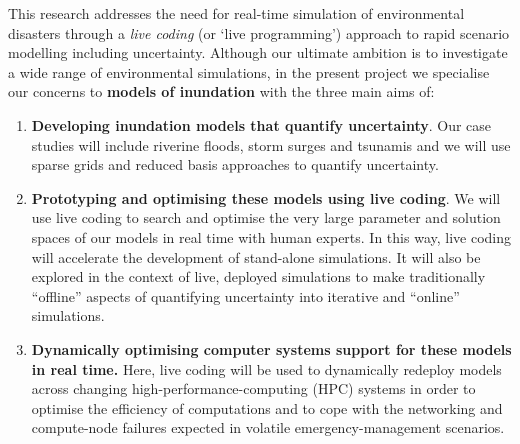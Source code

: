 This research addresses the need for real-time simulation of
environmental disasters through a {\em live coding} (or ‘live programming’)
approach to {rapid scenario modelling including uncertainty}. Although our ultimate ambition is to investigate a wide range of environmental simulations, in the present project we specialise our concerns to {\bf models of inundation} with the three main aims of:
\begin{enumerate}

\item {\bf Developing inundation models that quantify uncertainty}. Our case studies will include riverine floods,
  storm surges and tsunamis and we will use sparse grids and reduced basis
  approaches to quantify uncertainty.
  

\item {\bf Prototyping and optimising these models using live coding}. We will use live coding to 
  search and optimise the very large parameter and solution spaces of our models in real time with human 
  experts. 
  In this way, live coding will accelerate the development of stand-alone simulations. It will also be explored in the 
  context of  live, deployed simulations to make traditionally ``offline'' aspects of 
   quantifying uncertainty into iterative and ``online'' simulations.
  

\item {\bf Dynamically optimising computer systems support for  these models in real time.}
Here, live coding will be used
  to dynamically redeploy models across changing high-performance-computing (HPC) 
  systems in order to optimise the efficiency of computations and 
  to cope with the networking and compute-node failures expected in volatile emergency-management scenarios.

\end{enumerate}

